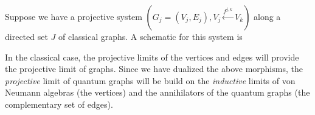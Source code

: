 \documentclass[12pt]{article}
\theoremstyle{definition}
\newcommand{\<}{\langle}
\renewcommand{\>}{\rangle}
\begin{document}
Suppose we have a projective system $(G_j = (V_j, E_j), V_j \overset{f^{j,k}}{\leftarrow} V_k)$ along a directed set $J$ of classical graphs. A schematic for this system is

\begin{center}
\end{center}
In the classical case, the projective limits of the vertices and edges will provide the projective limit of graphs. Since we have dualized the above morphisms, the \textit{projective} limit of quantum graphs will be build on the \textit{inductive} limits of von Neumann algebras (the vertices) and the annihilators of the quantum graphs (the complementary set of edges). 
\end{document}
